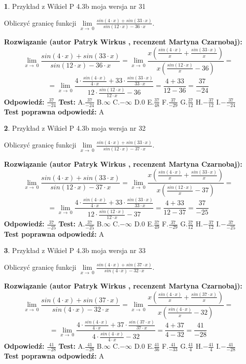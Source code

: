 \documentclass[12pt, a4paper]{article}
\theoremstyle{definition} %
\newtheorem{zad}{}
\newcommand{\zadStart}[1]{\begin{zad}#1\newline}
\newcommand{\zadStop}{\end{zad}}
\newcommand{\rozwStart}[2]{\noindent \textbf{Rozwiązanie (autor #1 , recenzent #2): }\newline}
\newcommand{\rozwStop}{\newline}
\newcommand{\odpStart}{\noindent \textbf{Odpowiedź:}\newline}
\newcommand{\odpStop}{\newline}
\newcommand{\testStart}{\noindent \textbf{Test:}\newline}
\newcommand{\testStop}{\newline}
\newcommand{\kluczStart}{\noindent \textbf{Test poprawna odpowiedź:}\newline}
\newcommand{\kluczStop}{\newline}
\begin{document}
\zadStart{Przykład z Wikieł P 4.3b moja wersja nr 31}


Obliczyć granicę funkcji $\lim\limits_{x\to\ 0}\frac{sin(4 \cdot x)+sin(33 \cdot x)}{sin(12 \cdot x)-36 \cdot x}$.
\zadStop
\rozwStart{Patryk Wirkus}{Martyna Czarnobaj}
$$\lim\limits_{x\to\ 0}\frac{sin(4 \cdot x)+sin(33 \cdot x)}{sin(12 \cdot x)-36 \cdot x}=\lim\limits_{x\to\ 0}\frac{x(\frac{sin(4 \cdot x)}{x}+\frac{sin(33 \cdot x)}{x})}{x(\frac{sin(12 \cdot x)}{x}-36)}=$$
$$=\lim\limits_{x\to\ 0}\frac{4 \cdot \frac{sin(4 \cdot x)}{4 \cdot x}+33 \cdot \frac{sin(33 \cdot x)}{33 \cdot x}}{12 \cdot \frac{sin(12 \cdot x)}{12 \cdot x}-36}=\frac{4+33}{12-36} = \frac{37}{-24}$$
\rozwStop
\odpStart
$\frac{37}{-24}$
\odpStop
\testStart
A.$\frac{37}{-24}$
B.$\infty$
C.$-\infty$
D.$0$
E.$\frac{37}{48}$
F.$\frac{37}{-29}$
G.$\frac{37}{12}$
H.$-\frac{37}{12}$
I.$-\frac{37}{-24}$
\testStop
\kluczStart
A
\kluczStop



\zadStart{Przykład z Wikieł P 4.3b moja wersja nr 32}


Obliczyć granicę funkcji $\lim\limits_{x\to\ 0}\frac{sin(4 \cdot x)+sin(33 \cdot x)}{sin(12 \cdot x)-37 \cdot x}$.
\zadStop
\rozwStart{Patryk Wirkus}{Martyna Czarnobaj}
$$\lim\limits_{x\to\ 0}\frac{sin(4 \cdot x)+sin(33 \cdot x)}{sin(12 \cdot x)-37 \cdot x}=\lim\limits_{x\to\ 0}\frac{x(\frac{sin(4 \cdot x)}{x}+\frac{sin(33 \cdot x)}{x})}{x(\frac{sin(12 \cdot x)}{x}-37)}=$$
$$=\lim\limits_{x\to\ 0}\frac{4 \cdot \frac{sin(4 \cdot x)}{4 \cdot x}+33 \cdot \frac{sin(33 \cdot x)}{33 \cdot x}}{12 \cdot \frac{sin(12 \cdot x)}{12 \cdot x}-37}=\frac{4+33}{12-37} = \frac{37}{-25}$$
\rozwStop
\odpStart
$\frac{37}{-25}$
\odpStop
\testStart
A.$\frac{37}{-25}$
B.$\infty$
C.$-\infty$
D.$0$
E.$\frac{37}{49}$
F.$\frac{37}{-29}$
G.$\frac{37}{12}$
H.$-\frac{37}{12}$
I.$-\frac{37}{-25}$
\testStop
\kluczStart
A
\kluczStop



\zadStart{Przykład z Wikieł P 4.3b moja wersja nr 33}


Obliczyć granicę funkcji $\lim\limits_{x\to\ 0}\frac{sin(4 \cdot x)+sin(37 \cdot x)}{sin(4 \cdot x)-32 \cdot x}$.
\zadStop
\rozwStart{Patryk Wirkus}{Martyna Czarnobaj}
$$\lim\limits_{x\to\ 0}\frac{sin(4 \cdot x)+sin(37 \cdot x)}{sin(4 \cdot x)-32 \cdot x}=\lim\limits_{x\to\ 0}\frac{x(\frac{sin(4 \cdot x)}{x}+\frac{sin(37 \cdot x)}{x})}{x(\frac{sin(4 \cdot x)}{x}-32)}=$$
$$=\lim\limits_{x\to\ 0}\frac{4 \cdot \frac{sin(4 \cdot x)}{4 \cdot x}+37 \cdot \frac{sin(37 \cdot x)}{37 \cdot x}}{4 \cdot \frac{sin(4 \cdot x)}{4 \cdot x}-32}=\frac{4+37}{4-32} = \frac{41}{-28}$$
\rozwStop
\odpStart
$\frac{41}{-28}$
\odpStop
\testStart
A.$\frac{41}{-28}$
B.$\infty$
C.$-\infty$
D.$0$
E.$\frac{41}{36}$
F.$\frac{41}{-33}$
G.$\frac{41}{4}$
H.$-\frac{41}{4}$
I.$-\frac{41}{-28}$
\testStop
\kluczStart
A
\kluczStop
\end{document}
